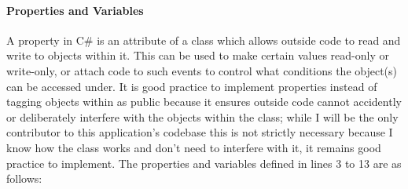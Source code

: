 ﻿\documentclass{article}
\begin{document}
    \paragraph{Properties and Variables}
    A property in C\# is an attribute of a class which allows outside code to read and write to objects within it.
    This can be used to make certain values read-only or write-only, or attach code to such events to control what conditions the object(s) can be accessed under.
    It is good practice to implement properties instead of tagging objects within as public because it ensures outside code cannot accidently or deliberately interfere with the objects within the class; while I will be the only contributor to this application's codebase this is not strictly necessary because I know how the class works and don't need to interfere with it, it remains good practice to implement.
    The properties and variables defined in lines 3 to 13 are as follows:
\end{document}
